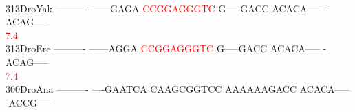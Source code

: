 \documentclass[11pt,twoside,reqno,a4paper]{article}
\begin{document}
{\hspace*{4\charwidth}\hspace*{7\charwidth}\hspace*{1\charwidth}\hspace*{1\charwidth}\hspace*{1\charwidth}\hspace*{1\charwidth}\hspace*{1\charwidth}\hspace*{1\charwidth}\\
313\hspace*{1\charwidth}DroYak	----------	------GAGA	\textcolor{Red}{C}\textcolor{Red}{C}\textcolor{Red}{G}\textcolor{Red}{G}\textcolor{Red}{A}\textcolor{Red}{G}\textcolor{Red}{G}\textcolor{Red}{G}\textcolor{Red}{T}\textcolor{Red}{C}	G-----GACC	ACACA-----	-ACAG-----	\\
\hspace*{4\charwidth}\hspace*{7\charwidth}\hspace*{1\charwidth}\hspace*{1\charwidth}\hspace*{20\charwidth}\textcolor{Red}{7.4}\hspace*{1\charwidth}\hspace*{1\charwidth}\hspace*{1\charwidth}\hspace*{1\charwidth}\\
313\hspace*{1\charwidth}DroEre	----------	------AGGA	\textcolor{Red}{C}\textcolor{Red}{C}\textcolor{Red}{G}\textcolor{Red}{G}\textcolor{Red}{A}\textcolor{Red}{G}\textcolor{Red}{G}\textcolor{Red}{G}\textcolor{Red}{T}\textcolor{Red}{C}	G-----GACC	ACACA-----	-ACAG-----	\\
\hspace*{4\charwidth}\hspace*{7\charwidth}\hspace*{1\charwidth}\hspace*{1\charwidth}\hspace*{20\charwidth}\textcolor{Red}{7.4}\hspace*{1\charwidth}\hspace*{1\charwidth}\hspace*{1\charwidth}\hspace*{1\charwidth}\\
300\hspace*{1\charwidth}DroAna	----------	----GAATCA	CAAGCGGTCC	AAAAAAGACC	ACACA-----	-ACCG-----	\\
}
\end{document}

